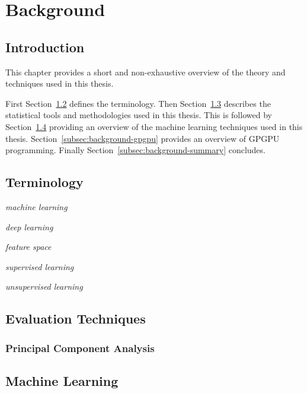 \chapter{Background}
\label{chap:background}

\section{Introduction}

This chapter provides a short and non-exhaustive overview of the theory and techniques used in this thesis.

First Section~\ref{subsec:background-terminology} defines the terminology. Then Section~\ref{subsec:background-statistics} describes the statistical tools and methodologies used in this thesis. This is followed by Section~\ref{subsec:background-machine-learning} providing an overview of the machine learning techniques used in this thesis. Section~\ref{subsec:background-gpgpu} provides an overview of GPGPU programming. Finally Section~\ref{subsec:background-summary} concludes.


\section{Terminology}
\label{subsec:background-terminology}

\emph{machine learning}

\emph{deep learning}

\emph{feature space}

\emph{supervised learning}

\emph{unsupervised learning}


\section{Evaluation Techniques}
\label{subsec:background-statistics}

\subsection{Principal Component Analysis}


\section{Machine Learning}
\label{subsec:background-machine-learning}

